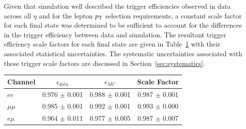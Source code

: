 Given that simulation well described the trigger efficiencies observed in data across all $\eta$ and for the lepton $p_{\mathrm{T}}$ selection requirements, a constant scale factor for each final state was determined to be sufficient to account for the differences in the trigger efficiency between data and simulation.
The resultant trigger efficiency scale factors for each final state are given in Table~\ref{tab:triggerSFs} with their associated statistical uncertainties.
The systematic uncertainties associated with these trigger scale factors are discussed in Section~\ref{sec:systematics}.

\begin{table}[htbp]
\label{tab:triggerSFs}
  \centering
 \begin{tabular}{lccc}
   \hline
   \textbf{Channel} & \textbf{$\epsilon _{data}$} & \textbf{$\epsilon _{MC}$} & \textbf{Scale Factor}\\
   \hline   
   $ee$ & 0.976 $\pm$ 0.001 & 0.988 $\pm$ 0.001 & 0.987 $\pm$ 0.001\\
   $\mu\mu$ & 0.985 $\pm$ 0.001 & 0.992 $\pm$ 0.001 & 0.993 $\pm$ 0.000  \\
   $e \mu$ & 0.964 $\pm$ 0.011 & 0.977 $\pm$ 0.005 & 0.987 $\pm$ 0.007\\
   \hline
 \end{tabular}%
\end{table}




